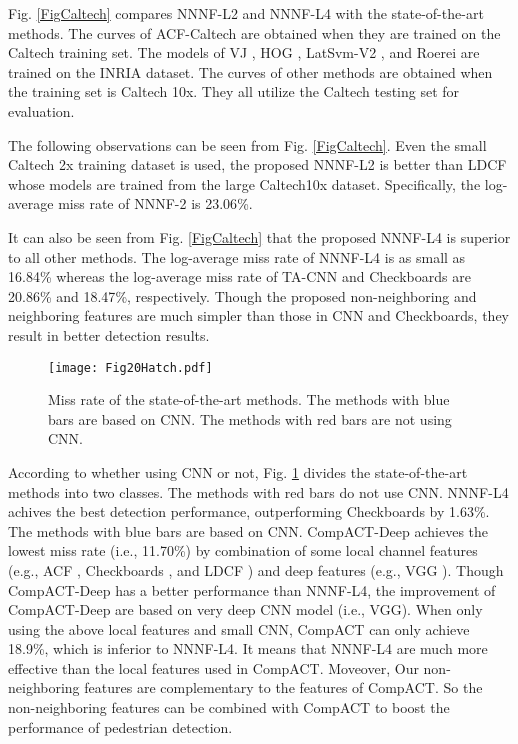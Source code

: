 \documentclass[10pt,twocolumn,letterpaper]{article}
\begin{document}
Fig. \ref{FigCaltech} compares NNNF-L2 and NNNF-L4 with the state-of-the-art 
methods. The 
curves of ACF-Caltech \cite{Dollar_PD_PAMI_2012} are obtained when they are trained on the Caltech 
training set. The models of VJ \cite{Viola_RoFace_IJCV_2004}, HOG \cite{Dalal_HOG_CVPR_2005}, LatSvm-V2 \cite{Felzenszwalb_DPM_CVPR_2008}, and Roerei \cite{Benenson_SquareChns_CVPR_2013} are trained on the INRIA dataset. The 
curves of other methods are obtained when the training set is Caltech 10x. 
They all utilize the Caltech testing set for evaluation. 

The following observations can be seen from Fig. \ref{FigCaltech}. Even the small Caltech 
2x training dataset is used, the proposed NNNF-L2 is better than LDCF \cite{Nam_LDCF_NIPS_2014} whose 
models are trained from the large Caltech10x dataset. Specifically, the 
log-average miss rate of NNNF-2 is 23.06{\%}. 

It can also be seen from Fig. \ref{FigCaltech} that the proposed NNNF-L4 is superior to 
all other methods. The log-average 
miss rate of NNNF-L4 is as small as 16.84{\%} whereas the log-average miss 
rate of TA-CNN \cite{Tian_Ta_CVPR_2015} and Checkboards \cite{Zhang_FCF_CVPR_2015} are 20.86{\%} and 18.47{\%}, 
respectively. Though the proposed non-neighboring and neighboring features 
are much simpler than those in CNN and Checkboards, they result in better detection results. 

\begin{figure}[!t]
\centering
\texttt{[image: Fig20Hatch.pdf]}
\caption{Miss rate of the state-of-the-art methods. The methods with blue bars are based on CNN. The methods with red bars are not using CNN.}
\label{FigHatch}
\end{figure}

According to whether using CNN or not, Fig. \ref{FigHatch} divides the state-of-the-art 
methods into two classes. The methods with red bars do not use CNN. NNNF-L4 achives the best detection performance, outperforming Checkboards \cite{Zhang_FCF_CVPR_2015} by 1.63\%. The methods with blue bars are based on CNN. CompACT-Deep \cite{Cai_DeepPed_ICCV_2015} achieves the lowest miss rate (i.e., 11.70\%) by combination of some local channel features (e.g., ACF \cite{Dollar_PD_PAMI_2012}, Checkboards \cite{Zhang_FCF_CVPR_2015}, and LDCF \cite{Nam_LDCF_NIPS_2014}) and deep features (e.g., VGG \cite{Simonyan_VGG_arxiv_2014}). Though CompACT-Deep \cite{Cai_DeepPed_ICCV_2015} has a better performance than NNNF-L4, the improvement of CompACT-Deep are based on very deep CNN model (i.e., VGG). When only using the above local features and small CNN, CompACT can only achieve 18.9\%, which is inferior to NNNF-L4. It means that NNNF-L4 are much more effective than the local features used in CompACT. Moveover, Our non-neighboring features are complementary to the features of CompACT. So the non-neighboring features can be combined with CompACT to boost the performance of pedestrian detection.
\end{document}
